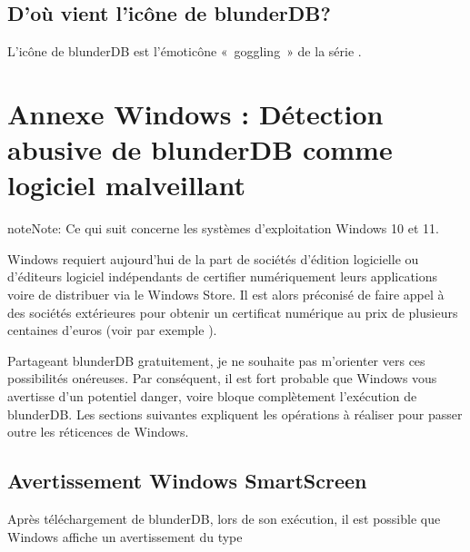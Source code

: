\documentclass[letterpaper,10pt,french]{sphinxmanual}
\begin{document}
\subsection{D’où vient l’icône de blunderDB?}
\label{\detokenize{faq:d-ou-vient-l-icone-de-blunderdb}}
\sphinxAtStartPar
L’icône de blunderDB est l’émoticône « goggling » de la série .

\sphinxstepscope


\section{Annexe Windows : Détection abusive de blunderDB comme logiciel malveillant}
\label{\detokenize{annexe_windows_securite:annexe-windows-detection-abusive-de-blunderdb-comme-logiciel-malveillant}}\label{\detokenize{annexe_windows_securite:annexe-windows-malware}}\label{\detokenize{annexe_windows_securite::doc}}
\begin{sphinxadmonition}{note}{Note:}
\sphinxAtStartPar
Ce qui suit concerne les systèmes d’exploitation Windows 10 et 11.
\end{sphinxadmonition}

\sphinxAtStartPar
Windows requiert aujourd’hui de la part de sociétés d’édition logicielle ou
d’éditeurs logiciel indépendants de certifier numériquement leurs applications
voire de distribuer via le Windows Store. Il est alors préconisé de faire appel
à des sociétés extérieures pour obtenir un certificat numérique au prix de
plusieurs centaines d’euros (voir par exemple
).

\sphinxAtStartPar
Partageant blunderDB gratuitement, je ne souhaite pas m’orienter vers ces
possibilités onéreuses. Par conséquent, il est fort probable que Windows vous
avertisse d’un potentiel danger, voire bloque complètement l’exécution de
blunderDB. Les sections suivantes expliquent les opérations à réaliser pour
passer outre les réticences de Windows.


\subsection{Avertissement Windows SmartScreen}
\label{\detokenize{annexe_windows_securite:avertissement-windows-smartscreen}}
\sphinxAtStartPar
Après téléchargement de blunderDB, lors de son exécution, il est possible que
Windows affiche un avertissement du type
\end{document}
